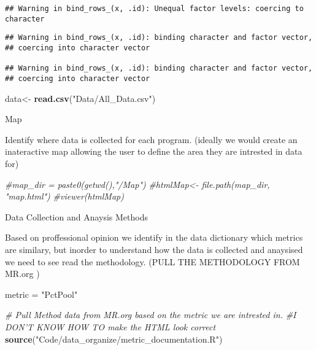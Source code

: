 \documentclass[]{article}
\newenvironment{Shaded}{\begin{snugshade}}{\end{snugshade}}
\newcommand{\CommentTok}[1]{\textcolor[rgb]{0.56,0.35,0.01}{\textit{#1}}}
\newcommand{\KeywordTok}[1]{\textcolor[rgb]{0.13,0.29,0.53}{\textbf{#1}}}
\newcommand{\NormalTok}[1]{#1}
\newcommand{\StringTok}[1]{\textcolor[rgb]{0.31,0.60,0.02}{#1}}
\begin{document}
\begin{verbatim}
## Warning in bind_rows_(x, .id): Unequal factor levels: coercing to character
\end{verbatim}

\begin{verbatim}
## Warning in bind_rows_(x, .id): binding character and factor vector,
## coercing into character vector

## Warning in bind_rows_(x, .id): binding character and factor vector,
## coercing into character vector
\end{verbatim}

\begin{Shaded}
\begin{Highlighting}[]
\NormalTok{data<-}\StringTok{ }\KeywordTok{read.csv}\NormalTok{(}\StringTok{"Data/All_Data.csv"}\NormalTok{) }
\end{Highlighting}
\end{Shaded}

Map

Identify where data is collected for each program. (ideally we would
create an inateractive map allowing the user to define the area they are
intrested in data for)

\begin{Shaded}
\begin{Highlighting}[]
\CommentTok{#map_dir = paste0(getwd(),"/Map")}
\CommentTok{#htmlMap<- file.path(map_dir, "map.html")}
\CommentTok{#viewer(htmlMap) }
\end{Highlighting}
\end{Shaded}

Data Collection and Anaysis Methods

Based on proffessional opinion we identify in the data dictionary which
metrics are similary, but inorder to understand how the data is
collected and anaysised we need to see read the methodology. (PULL THE
METHODOLOGY FROM MR.org )

\begin{Shaded}
\begin{Highlighting}[]
\NormalTok{metric =}\StringTok{ "PctPool"}

\CommentTok{# Pull Method data from MR.org based on the metric we are intrested in. }
\CommentTok{#I DON'T KNOW HOW TO make the HTML look correct }
\KeywordTok{source}\NormalTok{(}\StringTok{"Code/data_organize/metric_documentation.R"}\NormalTok{)}
\end{Highlighting}
\end{Shaded}
\end{document}

